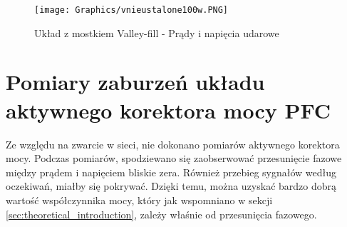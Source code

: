 \begin{figure}[H]
    \centering
    \texttt{[image: Graphics/vnieustalone100w.PNG]}
    \caption{Układ z mostkiem Valley-fill - Prądy i napięcia udarowe}
    \label{img:valley100W_nieustalone}
\end{figure}

\section{Pomiary zaburzeń układu aktywnego korektora mocy PFC}
Ze względu na zwarcie w sieci, nie dokonano pomiarów aktywnego korektora mocy. Podczas pomiarów, spodziewano się zaobserwować przesunięcie fazowe między prądem i napięciem bliskie zera. Również przebieg sygnałów według oczekiwań, miałby się pokrywać. Dzięki temu, można uzyskać bardzo dobrą wartość współczynnika mocy, który jak wspomniano w sekcji \ref{sec:theoretical_introduction}, zależy właśnie od przesunięcia fazowego.

